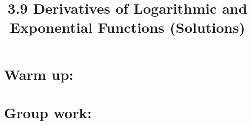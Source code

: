 \documentclass[nooutcomes]{ximera}
\title{3.9 Derivatives of Logarithmic and Exponential Functions (Solutions)}
\begin{document}
\begin{abstract}		\end{abstract}
\maketitle

\section*{Warm up:} 

		\begin{freeResponse}
		
		\end{freeResponse}	
		
		
		

	
	
	
	
	

\section*{Group work:}



\begin{problem}

		\begin{freeResponse}
		
		\end{freeResponse}
		
		
\end{problem}
















\begin{problem}

		\begin{freeResponse}
		
		\end{freeResponse}
		
		
		

\end{problem}
	
	
	
	
	
	
	
	
			
			

\begin{problem}

		\begin{freeResponse}
			
		\end{freeResponse}
			
			
		
\end{problem}
\end{document}
